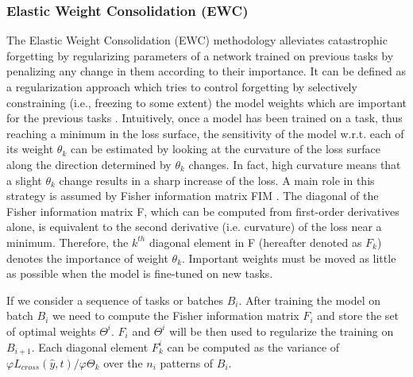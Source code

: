 \documentclass[english, LaM, oneside]{sapthesis}%
\begin{document}
\subsubsection{Elastic Weight Consolidation (EWC)}
The Elastic Weight Consolidation (EWC) methodology alleviates catastrophic forgetting by regularizing parameters of a network trained on previous tasks by penalizing any change in them according to their importance. It can be defined as a regularization approach which tries to control forgetting by selectively constraining (i.e., freezing to some extent) the model weights which are important for the previous tasks \cite{ewc}. Intuitively, once a model has been trained on a task, thus reaching a minimum in the loss surface, the sensitivity of the model w.r.t. each of its weight $\theta_k$ can be estimated by looking at the curvature of the loss surface along the direction determined by $\theta_k$ changes. In fact, high curvature means that a slight $\theta_k$ change results in a sharp increase of the loss. A main role in this strategy is assumed by Fisher information matrix FIM \cite{fisher}. The diagonal of the Fisher information matrix F, which can be computed from first-order derivatives alone, is equivalent to the second derivative (i.e. curvature) of the loss near a minimum. Therefore, the $k^{th}$ diagonal element in F (hereafter denoted as $F_k$) denotes the importance of weight $\theta_k$. Important weights must be moved as little as possible when the model is fine-tuned on new tasks.

If we consider a sequence of tasks or batches $B_i$. After training the model on batch $B_i$ we need to compute the Fisher information matrix $F_i$ and store the set of optimal weights $\Theta^i$. $F_i$ and $\Theta^i$ will be then used to regularize the training on $B_{i+1}$. Each diagonal element $F_k^i$ can be computed as the variance of $\varphi L_{cross}(\hat{y},t)/\varphi \Theta_k$ over the $n_i$ patterns of $B_i$.
\end{document}
